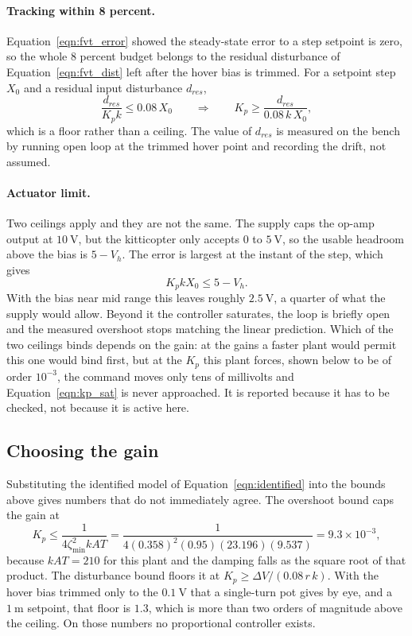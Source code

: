 \paragraph{Tracking within 8 percent.} Equation~\eqref{eqn:fvt_error} showed the steady-state
error to a step setpoint is zero, so the whole $8$ percent budget belongs to the residual
disturbance of Equation~\eqref{eqn:fvt_dist} left after the hover bias is trimmed. For a
setpoint step $X_0$ and a residual input disturbance $d_{res}$,
\begin{equation}
    \frac{d_{res}}{K_p k} \leq 0.08\,X_0
    \qquad \Rightarrow \qquad
    K_p \geq \frac{d_{res}}{0.08\,k\,X_0} ,
\end{equation}
which is a floor rather than a ceiling. The value of $d_{res}$ is measured on the bench by
running open loop at the trimmed hover point and recording the drift, not assumed.

\paragraph{Actuator limit.} Two ceilings apply and they are not the same. The supply caps the
op-amp output at $10\ \mathrm{V}$, but the kitticopter only accepts $0$ to $5\ \mathrm{V}$, so
the usable headroom above the bias is $5 - V_h$. The error is largest at the instant of the
step, which gives
\begin{equation}\label{eqn:kp_sat}
    K_p k X_0 \leq 5 - V_h .
\end{equation}
With the bias near mid range this leaves roughly $2.5\ \mathrm{V}$, a quarter of what the supply
would allow. Beyond it the controller saturates, the loop is briefly open and the measured
overshoot stops matching the linear prediction. Which of the two ceilings binds depends on the
gain: at the gains a faster plant would permit this one would bind first, but at the
$K_p$ this plant forces, shown below to be of order $10^{-3}$, the command moves only tens of
millivolts and Equation~\eqref{eqn:kp_sat} is never approached. It is reported because it has to
be checked, not because it is active here.

\subsection{Choosing the gain}
Substituting the identified model of Equation~\eqref{eqn:identified} into the bounds above gives
numbers that do not immediately agree. The overshoot bound caps the gain at
\begin{equation}
    K_p \le \frac{1}{4\zeta_{\min}^2 k A T}
         = \frac{1}{4(0.358)^2(0.95)(23.196)(9.537)}
         = 9.3 \times 10^{-3} ,
\end{equation}
because $kAT = 210$ for this plant and the damping falls as the square root of that product. The
disturbance bound floors it at $K_p \ge \Delta V/(0.08\,r\,k)$. With the hover bias trimmed only
to the $0.1\ \mathrm{V}$ that a single-turn pot gives by eye, and a $1\ \mathrm{m}$ setpoint, that
floor is $1.3$, which is more than two orders of magnitude above the ceiling. On those numbers no
proportional controller exists.


